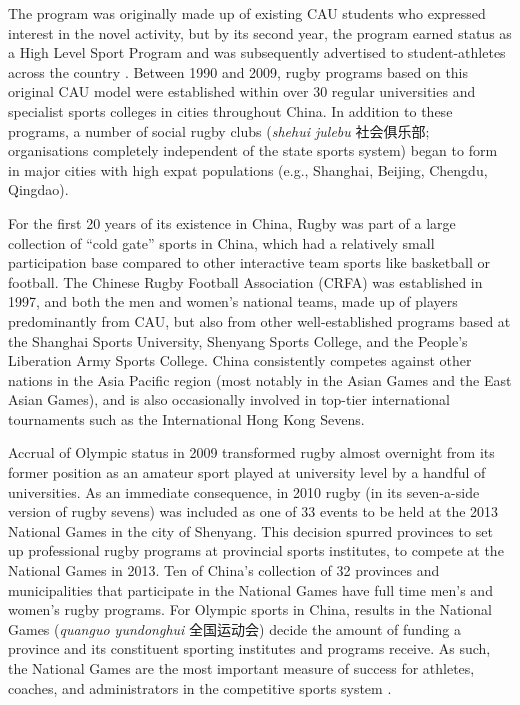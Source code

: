 \begin{CJK}{UTF8}{gbsn}
The program was originally made up of existing CAU students who expressed interest in the novel activity, but by its second year, the program earned status as a High Level Sport Program and was subsequently advertised to student-athletes across the country \citep[2]{Xu2010}.  Between 1990 and 2009, rugby programs based on this original CAU model were established within over 30 regular universities and specialist sports colleges in cities throughout China.  In addition to these programs, a number of social rugby clubs (\textit{shehui julebu} 社会俱乐部; organisations completely independent of the state sports system) began to form in major cities with high expat populations (e.g., Shanghai, Beijing, Chengdu, Qingdao).

For the first 20 years of its existence in China, Rugby was part of a large collection of ``cold gate'' sports in China, which had a relatively small participation base compared to other interactive team sports like basketball or football.  The Chinese Rugby Football Association (CRFA) was established in 1997, and both the men and women's national teams, made up of players predominantly from CAU, but also from other well-established programs based at the Shanghai Sports University, Shenyang Sports College, and the People's Liberation Army Sports College. China consistently competes against other nations in the Asia Pacific region (most notably in the Asian Games and the East Asian Games), and is also occasionally involved in top-tier international tournaments such as the International Hong Kong Sevens.

Accrual of Olympic status in 2009 transformed rugby almost overnight from its former position as an amateur sport played at university level by a handful of universities.  As an immediate consequence, in 2010 rugby (in its seven-a-side version of rugby sevens) was included as one of 33 events to be held at the 2013 National Games in the city of Shenyang.  This decision spurred provinces to set up professional rugby programs at provincial sports institutes, to compete at the National Games in 2013.  Ten of China's collection of 32 provinces and municipalities that participate in the National Games have full time men's and women's rugby programs.  For Olympic sports in China, results in the National Games (\textit{quanguo yundonghui} 全国运动会) decide the amount of funding a province and its constituent sporting institutes and programs receive.  As such, the National Games are the most important measure of success for athletes, coaches, and administrators in the competitive sports system \citep{Hong2002}.


\end{CJK}
